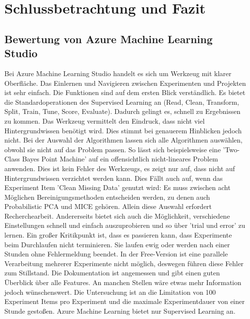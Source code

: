\chapter{Schlussbetrachtung und Fazit}


\section{Bewertung von Azure Machine Learning Studio}\label{sec:BeswertungAzure}
Bei Azure Machine Learning Studio handelt es sich um Werkzeug mit klarer Oberfläche. Das Einlernen und Navigieren zwischen Experimenten und Projekten ist sehr einfach. Die Funktionen sind auf dem ersten Blick verständlich. Es bietet die Standardoperationen des Supervised Learning an (Read, Clean, Transform, Split, Train, Tune, Score, Evaluate). Dadurch gelingt es, schnell zu Ergebnissen zu kommen.\newline
Das Werkzeug vermittelt den Eindruck, dass nicht viel Hintergrundwissen benötigt wird. Dies stimmt bei genauerem Hinblicken jedoch nicht. Bei der Auswahl der Algorithmen lassen sich alle Algorithmen auswählen, obwohl sie nicht auf das Problem passen. So lässt sich beispielsweise eine 'Two-Class Bayes Point Machine' auf ein offensichtlich nicht-lineares Problem anwenden. Dies ist kein Fehler des Werkzeugs, es zeigt nur auf, dass nicht auf Hintergrundwissen verzichtet werden kann. Dies Fällt auch auf, wenn  das Experiment Item 'Clean Missing Data' genutzt wird: Es muss zwischen acht Möglichen Bereinigungsmethoden entscheiden werden, zu denen auch Probabilistic PCA und MICE gehören. Allein diese Auswahl erfordert Recherchearbeit.
Andererseits bietet sich auch die Möglichkeit, verschiedene Einstellungen schnell und einfach auszuprobieren und so über 'trial und error' zu lernen.\newline
Ein großer Kritikpunkt ist, dass es passieren kann, dass Experimente beim Durchlaufen nicht terminieren. Sie laufen ewig oder werden nach einer Stunden ohne Fehlermeldung beendet. In der Free-Version ist eine parallele Verarbeitung mehrerer Experimente nicht möglich, deswegen führen diese Fehler zum Stillstand.\newline
Die Dokumentation ist angemessen und gibt einen guten Überblick über alle Features. An manchen Stellen wäre etwas mehr Information jedoch wünschenswert. Die Untersuchung ist an die Limitation von 100 Experiment Items pro Experiment und die maximale Experimentdauer von einer Stunde gestoßen.\newline
Azure Machine Learning bietet nur Supervised Learning an.\newline
